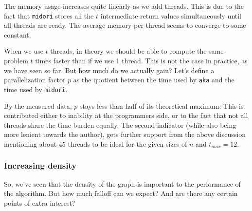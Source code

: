 \documentclass[a4paper]{article}
\newcommand{\code}{\texttt}
\begin{document}
The memory usage increases quite linearly as we add threads. This is due to the fact that \code{midori} stores all the $t$ intermediate return values simultaneously until all threads are ready. The average memory per thread seems to converge to some constant.

\bigskip

When we use $t$ threads, in theory we should be able to compute the same problem $t$ times faster than if we use 1 thread. This is not the case in practice, as we have seen so far. But how much do we actually gain? Let's define a parallelization factor $p$ as the quotient between the time used by \code{aka} and the time used by \code{midori}.

\begin{center}
\end{center}

By the measured data, $p$ stays less than half of its theoretical maximum. This is contributed either to inability at the programmers side, or to the fact that not all threads share the time burden equally. The second indicator (while also being more lenient towards the author), gets further support from the above discussion mentioning about 45 threads to be ideal for the given sizes of $n$ and $t_{max} = 12$.

\subsubsection{Increasing density}
So, we've seen that the density of the graph is important to the performance of the algorithm. But how much falloff can we expect? And are there any certain points of extra interest?
\end{document}
